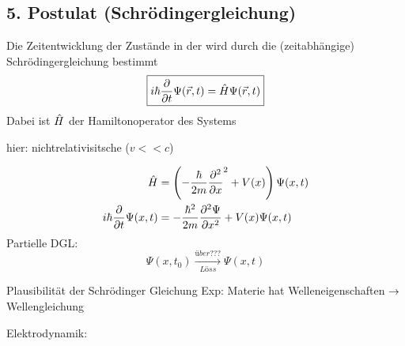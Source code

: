 \subsection{5. Postulat (Schrödingergleichung)} %
\label{sub:5._Postulat_(Schrödingergleichung)}
Die Zeitentwicklung der Zustände in der \QM wird durch die (zeitabhängige)
Schrödingergleichung bestimmt
\begin{equation*}
    \boxed{
        i \hbar  \frac{\partial }{\partial t } \Psi(\vec{r},t) = \hat{H}\Psi(\vec{r},t)
        }
\end{equation*}
Dabei ist $\hat{H}$ der Hamiltonoperator des Systems
\begin{bem}
    \item
    hier: nichtrelativisitsche \QM ($v <<  c$)
    \item
    \begin{align*}
        \hat{H} &= \left( - \frac{\hbar}{2m}\frac{\partial^2}{\partial x}^2 + V(x) \right) \Psi(x,t) \\
        i\hbar \frac{\partial}{\partial t} \Psi(x,t) 
        &=
        - \frac{\hbar^2}{2m} \frac{\partial^2 \Psi}{\partial x^2} + V(x)
        \Psi(x,t)
    \end{align*}    
    Partielle DGL:
    \begin{equation*}
        \Psi(x,t_0) \xrightarrow[Löss]{über ???} \Psi(x,t)
    \end{equation*}
    \item{Plausibilität der Schrödinger Gleichung}
    Exp: Materie hat Welleneigenschaften $\rightarrow$ Wellengleichung

    Elektrodynamik: 
    

\end{bem}
